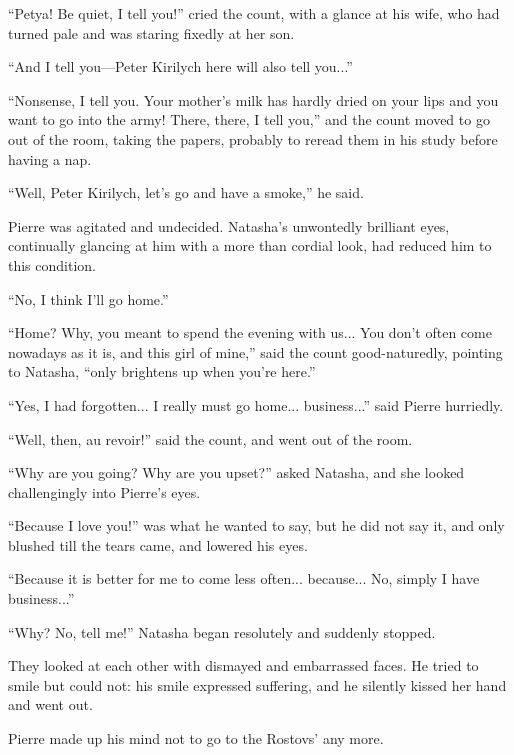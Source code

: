 ``Petya! Be quiet, I tell you!'' cried the count, with a glance
at his wife, who had turned pale and was staring fixedly at her
son.

``And I tell you---Peter Kirilych here will also tell you...''

``Nonsense, I tell you. Your mother's milk has hardly dried on
your lips and you want to go into the army! There, there, I tell
you,'' and the count moved to go out of the room, taking the
papers, probably to reread them in his study before having a nap.

``Well, Peter Kirilych, let's go and have a smoke,'' he said.

Pierre was agitated and undecided. Natasha's unwontedly brilliant
eyes, continually glancing at him with a more than cordial look,
had reduced him to this condition.

``No, I think I'll go home.''

``Home? Why, you meant to spend the evening with us... You don't
often come nowadays as it is, and this girl of mine,'' said the
count good-naturedly, pointing to Natasha, ``only brightens up
when you're here.''

``Yes, I had forgotten... I really must go home... business...''
said Pierre hurriedly.

``Well, then, au revoir!'' said the count, and went out of the
room.

``Why are you going? Why are you upset?'' asked Natasha, and she
looked challengingly into Pierre's eyes.

``Because I love you!'' was what he wanted to say, but he did not
say it, and only blushed till the tears came, and lowered his
eyes.

``Because it is better for me to come less
often... because... No, simply I have business...''

``Why? No, tell me!'' Natasha began resolutely and suddenly
stopped.

They looked at each other with dismayed and embarrassed faces. He
tried to smile but could not: his smile expressed suffering, and
he silently kissed her hand and went out.

Pierre made up his mind not to go to the Rostovs' any more.


